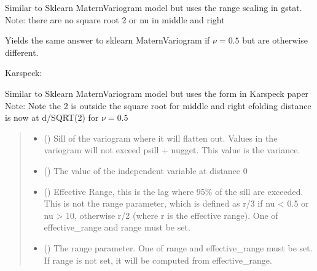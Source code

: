 \documentclass[letterpaper,10pt,english]{sphinxmanual}
\begin{document}
\begin{fulllineitems}
\sphinxAtStartPar
Similar to Sklearn MaternVariogram model but uses the range scaling in
gstat.
Note: there are no square root 2 or nu in middle and right

\sphinxAtStartPar
Yields the same answer to sklearn MaternVariogram if \(\nu=0.5\)
but are otherwise different.

\sphinxAtStartPar
Karspeck:

\sphinxAtStartPar
Similar to Sklearn MaternVariogram model but uses the form in Karspeck paper
Note: Note the 2 is outside the square root for middle and right
e\sphinxhyphen{}folding distance is now at d/SQRT(2) for \(\nu=0.5\)
\begin{quote}\begin{description}
\begin{itemize}
\item {}
\sphinxAtStartPar
{} () \textendash{} Sill of the variogram where it will flatten out. Values in the variogram
will not exceed psill + nugget. This value is the variance.

\item {}
\sphinxAtStartPar
{} () \textendash{} The value of the independent variable at distance 0

\item {}
\sphinxAtStartPar
{} () \textendash{} Effective Range, this is the lag where 95\% of the sill are exceeded.
This is not the range parameter, which is defined as r/3 if nu \textless{} 0.5 or
nu \textgreater{} 10, otherwise r/2 (where r is the effective range). One of
effective\_range and range must be set.

\item {}
\sphinxAtStartPar
{} () \textendash{} The range parameter. One of range and effective\_range must be set. If
range is not set, it will be computed from effective\_range.


\end{itemize}
\end{description}
\end{quote}
\end{fulllineitems}
\end{document}
